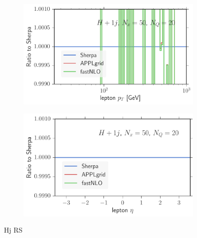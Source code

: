 \begin{figure}
\begin{subfigure}[]{0.49\textwidth}
	\includegraphics[width=\textwidth]{images/hjrs_lpt.pdf}
\end{subfigure}
\hfill
\begin{subfigure}[]{0.49\textwidth}
	\includegraphics[width=\textwidth]{images/hjrs_leta.pdf}
\end{subfigure}
\caption{Hj RS}
\end{figure}
%
